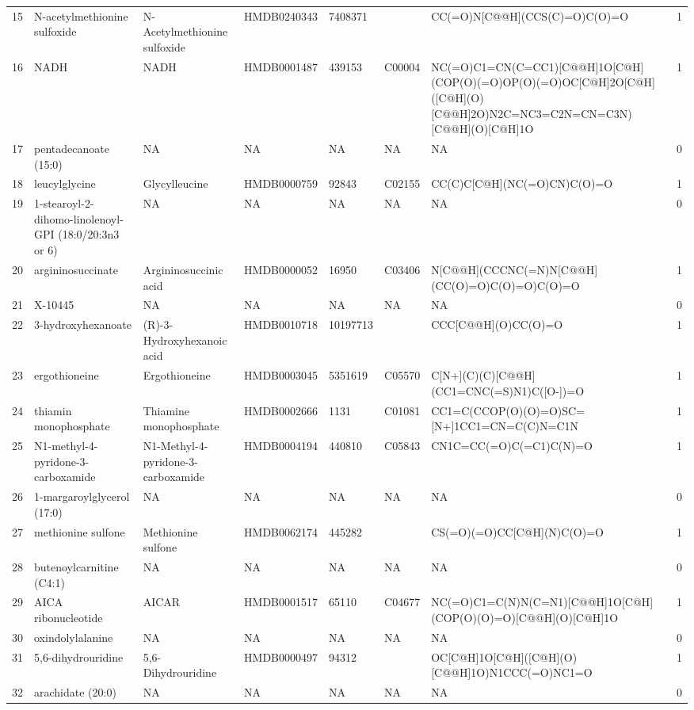 \documentclass[a4paper]{article}
\begin{document}
\begin{longtable}{rlllllll}
  15 & N-acetylmethionine sulfoxide & N-Acetylmethionine sulfoxide & HMDB0240343 & 7408371 &  & CC(=O)N[C@@H](CCS(C)=O)C(O)=O & 1 \\ 
  16 & NADH & NADH & HMDB0001487 & 439153 & C00004 & NC(=O)C1=CN(C=CC1)[C@@H]1O[C@H](COP(O)(=O)OP(O)(=O)OC[C@H]2O[C@H]([C@H](O)[C@@H]2O)N2C=NC3=C2N=CN=C3N)[C@@H](O)[C@H]1O & 1 \\ 
  17 & pentadecanoate (15:0) & NA & NA & NA & NA & NA & 0 \\ 
  18 & leucylglycine & Glycylleucine & HMDB0000759 & 92843 & C02155 & CC(C)C[C@H](NC(=O)CN)C(O)=O & 1 \\ 
  19 & 1-stearoyl-2-dihomo-linolenoyl-GPI (18:0/20:3n3 or 6) & NA & NA & NA & NA & NA & 0 \\ 
  20 & argininosuccinate & Argininosuccinic acid & HMDB0000052 & 16950 & C03406 & N[C@@H](CCCNC(=N)N[C@@H](CC(O)=O)C(O)=O)C(O)=O & 1 \\ 
  21 & X-10445 & NA & NA & NA & NA & NA & 0 \\ 
  22 & 3-hydroxyhexanoate & (R)-3-Hydroxyhexanoic acid & HMDB0010718 & 10197713 &  & CCC[C@@H](O)CC(O)=O & 1 \\ 
  23 & ergothioneine & Ergothioneine & HMDB0003045 & 5351619 & C05570 & C[N+](C)(C)[C@@H](CC1=CNC(=S)N1)C([O-])=O & 1 \\ 
  24 & thiamin monophosphate & Thiamine monophosphate & HMDB0002666 & 1131 & C01081 & CC1=C(CCOP(O)(O)=O)SC=[N+]1CC1=CN=C(C)N=C1N & 1 \\ 
  25 & N1-methyl-4-pyridone-3-carboxamide & N1-Methyl-4-pyridone-3-carboxamide & HMDB0004194 & 440810 & C05843 & CN1C=CC(=O)C(=C1)C(N)=O & 1 \\ 
  26 & 1-margaroylglycerol (17:0) & NA & NA & NA & NA & NA & 0 \\ 
  27 & methionine sulfone & Methionine sulfone & HMDB0062174 & 445282 &  & CS(=O)(=O)CC[C@H](N)C(O)=O & 1 \\ 
  28 & butenoylcarnitine (C4:1) & NA & NA & NA & NA & NA & 0 \\ 
  29 & AICA ribonucleotide & AICAR & HMDB0001517 & 65110 & C04677 & NC(=O)C1=C(N)N(C=N1)[C@@H]1O[C@H](COP(O)(O)=O)[C@@H](O)[C@H]1O & 1 \\ 
  30 & oxindolylalanine & NA & NA & NA & NA & NA & 0 \\ 
  31 & 5,6-dihydrouridine & 5,6-Dihydrouridine & HMDB0000497 & 94312 &  & OC[C@H]1O[C@H]([C@H](O)[C@@H]1O)N1CCC(=O)NC1=O & 1 \\ 
  32 & arachidate (20:0) & NA & NA & NA & NA & NA & 0 \\ 

\end{longtable}
\end{document}
